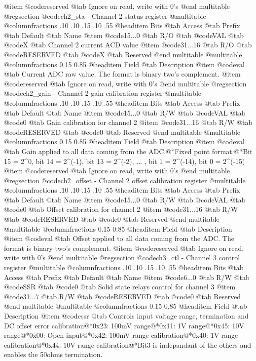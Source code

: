@item @code{reserved} @tab Ignore on read, write with 0's
@end multitable
@regsection @code{ch2_sta} - Channel 2 status register
@multitable @columnfractions .10 .10 .15 .10 .55
@headitem Bits @tab Access @tab Prefix @tab Default @tab Name
@item @code{15...0}
@tab R/O @tab
@code{VAL}
@tab @code{X} @tab 
Channel 2 current ACD value
@item @code{31...16}
@tab R/O @tab
@code{RESERVED}
@tab @code{X} @tab 
Reserved
@end multitable
@multitable @columnfractions 0.15 0.85
@headitem Field @tab Description
@item @code{val} @tab Current ADC raw value. The format is binary two's complement.
@item @code{reserved} @tab Ignore on read, write with 0's
@end multitable
@regsection @code{ch2_gain} - Channel 2 gain calibration register
@multitable @columnfractions .10 .10 .15 .10 .55
@headitem Bits @tab Access @tab Prefix @tab Default @tab Name
@item @code{15...0}
@tab R/W @tab
@code{VAL}
@tab @code{0} @tab 
Gain calibration for channel 2
@item @code{31...16}
@tab R/W @tab
@code{RESERVED}
@tab @code{0} @tab 
Reserved
@end multitable
@multitable @columnfractions 0.15 0.85
@headitem Field @tab Description
@item @code{val} @tab Gain applied to all data coming from the ADC.@*Fixed point format:@*Bit 15 = 2^0, bit 14 = 2^(-1), bit 13 = 2^(-2), ... , bit 1 = 2^(-14), bit 0 = 2^(-15)
@item @code{reserved} @tab Ignore on read, write with 0's
@end multitable
@regsection @code{ch2_offset} - Channel 2 offset calibration register
@multitable @columnfractions .10 .10 .15 .10 .55
@headitem Bits @tab Access @tab Prefix @tab Default @tab Name
@item @code{15...0}
@tab R/W @tab
@code{VAL}
@tab @code{0} @tab 
Offset calibration for channel 2
@item @code{31...16}
@tab R/W @tab
@code{RESERVED}
@tab @code{0} @tab 
Reserved
@end multitable
@multitable @columnfractions 0.15 0.85
@headitem Field @tab Description
@item @code{val} @tab Offset applied to all data coming from the ADC. The format is binary two's complement.
@item @code{reserved} @tab Ignore on read, write with 0's
@end multitable
@regsection @code{ch3_ctl} - Channel 3 control register
@multitable @columnfractions .10 .10 .15 .10 .55
@headitem Bits @tab Access @tab Prefix @tab Default @tab Name
@item @code{6...0}
@tab R/W @tab
@code{SSR}
@tab @code{0} @tab 
Solid state relays control for channel 3
@item @code{31...7}
@tab R/W @tab
@code{RESERVED}
@tab @code{0} @tab 
Reserved
@end multitable
@multitable @columnfractions 0.15 0.85
@headitem Field @tab Description
@item @code{ssr} @tab Controls input voltage range, termination and DC offset error calibration@*0x23: 100mV range@*0x11: 1V range@*0x45: 10V range@*0x00: Open input@*0x42: 100mV range calibration@*0x40: 1V range calibration@*0x44: 10V range calibration@*Bit3 is indepandant of the others and enables the 50ohms termination.
